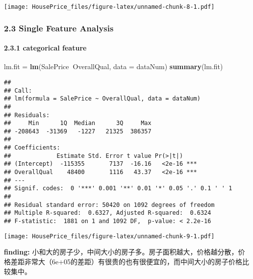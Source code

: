 \documentclass[]{article}
\newenvironment{Shaded}{\begin{snugshade}}{\end{snugshade}}
\newcommand{\KeywordTok}[1]{\textcolor[rgb]{0.13,0.29,0.53}{\textbf{#1}}}
\newcommand{\DataTypeTok}[1]{\textcolor[rgb]{0.13,0.29,0.53}{#1}}
\newcommand{\DecValTok}[1]{\textcolor[rgb]{0.00,0.00,0.81}{#1}}
\newcommand{\StringTok}[1]{\textcolor[rgb]{0.31,0.60,0.02}{#1}}
\newcommand{\OperatorTok}[1]{\textcolor[rgb]{0.81,0.36,0.00}{\textbf{#1}}}
\newcommand{\NormalTok}[1]{#1}
\let\oldparagraph\paragraph
\renewcommand{\paragraph}[1]{\oldparagraph{#1}\mbox{}}
\begin{document}
\texttt{[image: HousePrice\_files/figure-latex/unnamed-chunk-8-1.pdf]}

\subsubsection{2.3 Single Feature
Analysis}\label{single-feature-analysis}

\paragraph{2.3.1 categorical feature}\label{categorical-feature}

\begin{Shaded}
\begin{Highlighting}[]
\NormalTok{lm.fit =}\StringTok{ }\KeywordTok{lm}\NormalTok{(SalePrice}\OperatorTok{~}\NormalTok{OverallQual, }\DataTypeTok{data =}\NormalTok{ dataNum)}
\KeywordTok{summary}\NormalTok{(lm.fit) }
\end{Highlighting}
\end{Shaded}

\begin{verbatim}
## 
## Call:
## lm(formula = SalePrice ~ OverallQual, data = dataNum)
## 
## Residuals:
##     Min      1Q  Median      3Q     Max 
## -208643  -31369   -1227   21325  386357 
## 
## Coefficients:
##             Estimate Std. Error t value Pr(>|t|)    
## (Intercept)  -115355       7137  -16.16   <2e-16 ***
## OverallQual    48400       1116   43.37   <2e-16 ***
## ---
## Signif. codes:  0 '***' 0.001 '**' 0.01 '*' 0.05 '.' 0.1 ' ' 1
## 
## Residual standard error: 50420 on 1092 degrees of freedom
## Multiple R-squared:  0.6327, Adjusted R-squared:  0.6324 
## F-statistic:  1881 on 1 and 1092 DF,  p-value: < 2.2e-16
\end{verbatim}

\begin{Shaded}
\end{Shaded}

\texttt{[image: HousePrice\_files/figure-latex/unnamed-chunk-9-1.pdf]}

\textbf{finding:}
小和大的房子少，中间大小的房子多。房子面积越大，价格越分散，价格差距非常大（6e+05的差距）有很贵的也有很便宜的，而中间大小的房子价格比较集中。
\end{document}
